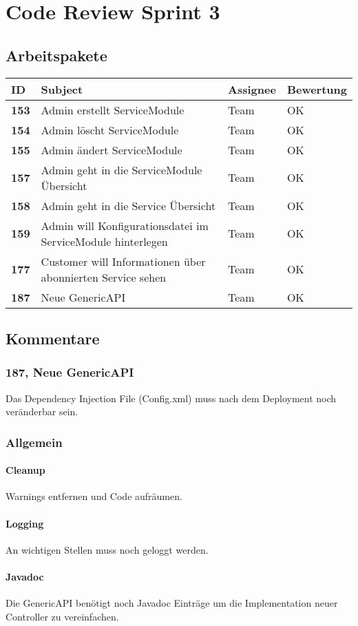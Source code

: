 
\chapter{Code Review Sprint 3}
\section{Arbeitspakete}

\begin{center}

\begin{tabularx}{\linewidth}{l l l l}
\textbf{ID} & \textbf{Subject} & \textbf{Assignee} & \textbf{Bewertung}\\
\hline
\textbf{153} & Admin erstellt ServiceModule & Team & OK\\
\textbf{154} & Admin löscht ServiceModule & Team & OK\\
\textbf{155} & Admin ändert ServiceModule & Team & OK\\
\textbf{157} & Admin geht in die ServiceModule Übersicht & Team & OK\\
\textbf{158} & Admin geht in die Service Übersicht & Team & OK\\
\textbf{159} & Admin will Konfigurationsdatei im ServiceModule hinterlegen & Team & OK\\
\textbf{177} & Customer will Informationen über abonnierten Service sehen & Team & OK\\
\textbf{187} & Neue GenericAPI & Team & OK\\
\end{tabularx}

\end{center}
\newpage

\section{Kommentare}

\subsection{187, Neue GenericAPI}
Das Dependency Injection File (Config.xml) muss nach dem Deployment noch veränderbar sein.

\subsection{Allgemein}
\subsubsection{Cleanup}
Warnings entfernen und Code aufräumen.

\subsubsection{Logging}
An wichtigen Stellen muss noch geloggt werden.

\subsubsection{Javadoc}
Die GenericAPI benötigt noch Javadoc Einträge um die Implementation neuer Controller zu vereinfachen.
